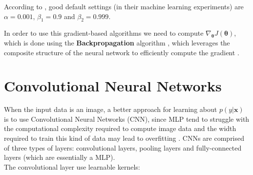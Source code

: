 According to \cite{kingma2017}, good default settings (in their machine learning experiments) are $\alpha=0.001$, $\beta_1=0.9$ and $\beta_2 = 0.999$.

In order to use this gradient-based algorithms we need to compute $\nabla_{\boldsymbol{\theta}} J(\boldsymbol{\theta})$, which is done using the \textbf{Backpropagation} algorithm \cite{rumelhart1986}, which leverages the composite structure of the neural network to efficiently compute the gradient \cite{damadi2023}.

\section{Convolutional Neural Networks}

When the input data is an image, a better approach for learning about $p(y | \mathbf{x})$ is to use Convolutional Neural Networks (CNN), since MLP tend to struggle with the computational complexity required to compute image data and the width required to train this kind of data may lead to overfitting \cite{oshea2015}. CNNs are comprised of three types of layers: convolutional layers, pooling layers and fully-connected layers (which are essentially a MLP).\\
The convolutional layer use learnable kernels:
